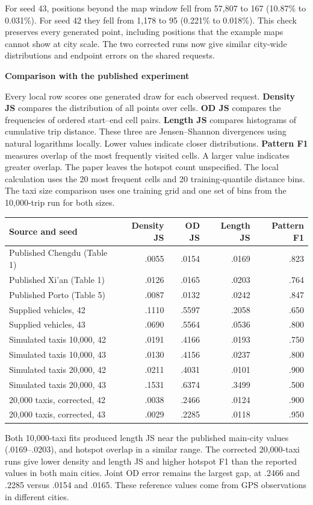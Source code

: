 \documentclass[11pt,a4paper]{article}
\newcommand{\heading}[1]{{\Large\sffamily\bfseries\color{ink}#1\par}\vspace{3pt}}
\begin{document}
For seed 43, positions beyond the map window fell from 57,807 to 167 (10.87\% to 0.031\%). For seed 42 they fell from 1,178 to 95 (0.221\% to 0.018\%). This check preserves every generated point, including positions that the example maps cannot show at city scale. The two corrected runs now give similar city-wide distributions and endpoint errors on the shared requests.

\newpage
\heading{Comparison with the published experiment}
Every local row scores one generated draw for each observed request. \textbf{Density JS} compares the distribution of all points over cells. \textbf{OD JS} compares the frequencies of ordered start--end cell pairs. \textbf{Length JS} compares histograms of cumulative trip distance. These three are Jensen--Shannon divergences using natural logarithms locally. Lower values indicate closer distributions. \textbf{Pattern F1} measures overlap of the most frequently visited cells. A larger value indicates greater overlap. The paper leaves the hotspot count unspecified. The local calculation uses the 20 most frequent cells and 20 training-quantile distance bins. The taxi size comparison uses one training grid and one set of bins from the 10,000-trip run for both sizes.

\begin{center}\small
\begin{tabular}{@{}lrrrr@{}}\toprule
Source and seed & Density JS & OD JS & Length JS & Pattern F1\\\midrule
Published Chengdu (Table 1) & .0055 & .0154 & .0169 & .823\\
Published Xi'an (Table 1) & .0126 & .0165 & .0203 & .764\\
Published Porto (Table 5) & .0087 & .0132 & .0242 & .847\\\midrule
Supplied vehicles, 42 & .1110 & .5597 & .2058 & .650\\
Supplied vehicles, 43 & .0690 & .5564 & .0536 & .800\\
Simulated taxis 10,000, 42 & .0191 & .4166 & .0193 & .750\\
Simulated taxis 10,000, 43 & .0130 & .4156 & .0237 & .800\\
Simulated taxis 20,000, 42 & .0211 & .4031 & .0101 & .900\\
Simulated taxis 20,000, 43 & .1531 & .6374 & .3499 & .500\\
20,000 taxis, corrected, 42 & .0038 & .2466 & .0124 & .900\\
20,000 taxis, corrected, 43 & .0029 & .2285 & .0118 & .950\\\bottomrule
\end{tabular}\end{center}
Both 10,000-taxi fits produced length JS near the published main-city values (.0169--.0203), and hotspot overlap in a similar range. The corrected 20,000-taxi runs give lower density and length JS and higher hotspot F1 than the reported values in both main cities. Joint OD error remains the largest gap, at .2466 and .2285 versus .0154 and .0165. These reference values come from GPS observations in different cities.
\end{document}
